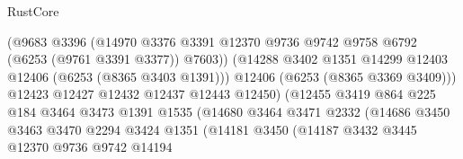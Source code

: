 \begin{lexlean}{RustCore}
\begin{coremodule}
                                      (@9683
                                        @3396
                                        (@14970
                                          @3376
                                          @3391
                                          @12370
                                          @9736
                                          @9742
                                          @9758
                                          @6792
                                          (@6253 (@9761 @3391 @3377))
                                          @7603))
                                      (@14288
                                        @3402
                                        @1351
                                        @14299
                                        @12403
                                        @12406
                                        (@6253 (@8365 @3403 @1391)))
                                      @12406
                                      (@6253 (@8365 @3369 @3409)))
                                    @12423
                                    @12427
                                    @12432
                                    @12437
                                    @12443
                                    @12450)
                                  (@12455
                                    @3419
                                    @864
                                    @225
                                    @184
                                    @3464
                                    @3473
                                    @1391
                                    @1535
                                    (@14680
                                      @3464
                                      @3471
                                      @2332
                                      (@14686
                                        @3450
                                        @3463
                                        @3470
                                        @2294
                                        @3424
                                        @1351
                                        (@14181
                                          @3450
                                          (@14187
                                            @3432
                                            @3445
                                            @12370
                                            @9736
                                            @9742
                                            @14194

\end{coremodule}
\end{lexlean}
